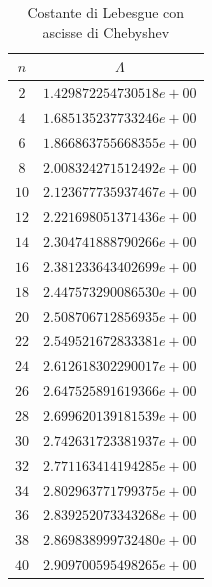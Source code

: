 \begin{table}
	\begin{center}
		\caption{Costante di Lebesgue con ascisse di Chebyshev}
		\begin{tabular}{|c|c|}
			\hline
			$n$ & $\Lambda$ \\
			\hline
			$2$  & $1.429872254730518e+00$ \\ 
			$4$  & $1.685135237733246e+00$ \\ 
			$6$  & $1.866863755668355e+00$ \\ 
			$8$  & $2.008324271512492e+00$ \\ 
			$10$ & $2.123677735937467e+00$ \\ 
			$12$ & $2.221698051371436e+00$ \\ 
			$14$ & $2.304741888790266e+00$ \\ 
			$16$ & $2.381233643402699e+00$ \\ 
			$18$ & $2.447573290086530e+00$ \\ 
			$20$ & $2.508706712856935e+00$ \\ 
			$22$ & $2.549521672833381e+00$ \\ 
			$24$ & $2.612618302290017e+00$ \\ 
			$26$ & $2.647525891619366e+00$ \\ 
			$28$ & $2.699620139181539e+00$ \\ 
			$30$ & $2.742631723381937e+00$ \\ 
			$32$ & $2.771163414194285e+00$ \\ 
			$34$ & $2.802963771799375e+00$ \\ 
			$36$ & $2.839252073343268e+00$ \\ 
			$38$ & $2.869838999732480e+00$ \\ 
			$40$ & $2.909700595498265e+00$ \\ 
			\hline
		\end{tabular}
	\end{center}
\end{table}
